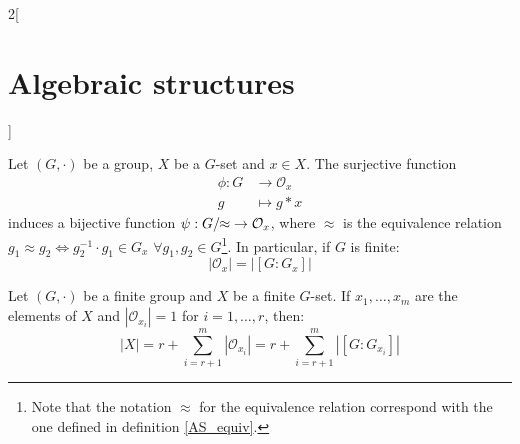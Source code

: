 \documentclass[../../../main.tex]{subfiles}
\begin{document}
\begin{multicols}{2}[\section{Algebraic structures}]
\begin{prop}
\end{prop}
\begin{theorem}
    Let $(G,\cdot)$ be a group, $X$ be a $G$-set and $x\in X$. The surjective function
    \begin{align*}
        \phi:G&\longrightarrow \mathcal{O}_x\\
        g&\longmapsto g*x
    \end{align*}
    induces a bijective function $\psi:\quot{G}{\!\!\approx}\;\rightarrow\mathcal{O}_x$, where $\approx$ is the equivalence relation $g_1\approx g_2\iff g_2^{-1}\cdot g_1\in G_x$ $\forall g_1,g_2\in G$\footnote{Note that the notation $\approx$ for the equivalence relation correspond with the one defined in definition \ref{AS_equiv}.}. In particular, if $G$ is finite: $$|\mathcal{O}_x|=|[G:G_x]|$$
\end{theorem}
\begin{corollary}
    Let $(G,\cdot)$ be a finite group and $X$ be a finite $G$-set. If $x_1,\ldots,x_m$ are the elements of $X$ and $|\mathcal{O}_{x_i}|=1$ for $i=1,\ldots,r$, then:
    \begin{equation}
        |X|=r+\sum_{i=r+1}^m|\mathcal{O}_{x_i}|=r+\sum_{i=r+1}^m|[G:G_{x_i}]|
        \label{AS-obritsformula}
    \end{equation}
\end{corollary}

\end{multicols}
\end{document}
